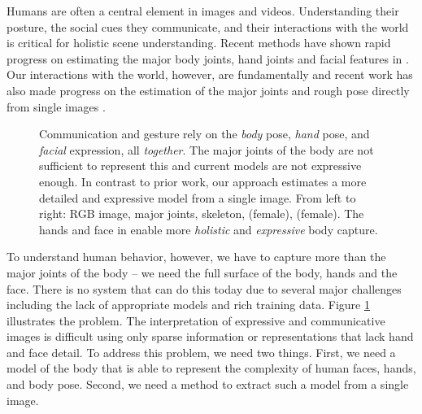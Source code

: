 Humans are often a central element in images and videos. 
Understanding their posture, the social cues they communicate, and their interactions with the world is critical for holistic scene understanding.
Recent methods have shown rapid progress on estimating the major body joints, hand joints and facial features in \twoD \cite{cao2017realtime,insafutdinov2016deepercut,simon2017hand}. 
Our interactions with the world, however, are fundamentally \threeD and recent work has also made progress on the \threeD estimation of the major joints and rough \threeD pose directly from single images \cite{bogo2016keep,kanazawa2018end,omran2018neural,pavlakos2018learning}. 

\newcommand{\ImgEmotionsHeightXX}{0.246}
\newcommand{\ImgEmotionsHeightYY}{0.31}
\newcommand{\ImgEmotionsHeightZZ}{0.160}
\newcommand{\ImgEmotionsHSpaceXX}{-3.0mm}
\newcommand{\ImgEmotionsVSpaceXX}{-4.0mm}
\begin{figure}
	\centering
	\vspace*{-01.00em}
	\vspace*{-00.50em}
	\caption{
				Communication and gesture rely on the \emph{body} pose, \emph{hand} pose, and \emph{facial} expression, all \emph{together}. 
				The major joints of the body are not sufficient to represent this and current \threeD models are not expressive enough. 
				In contrast to prior work, our approach estimates a more detailed and expressive \threeD model from a single image. 
				From left to right: RGB image, major joints, skeleton, \smpl (female), \smplHF (female). 
				The hands and face in \smplHF enable more \emph{holistic} and \emph{expressive} body capture. 
	}
	\label{fig:fromDotsToModels}
\vspace*{-3mm}
\end{figure}

 
To understand human behavior, however, we have to capture more than the major joints of the body -- we need the full \threeD surface of the body, hands and the face.
There is no system that can do this today due to several major challenges including the lack of appropriate \threeD models and rich \threeD training data.
Figure \ref{fig:fromDotsToModels} illustrates the problem. 
The interpretation of expressive and communicative images is difficult using only sparse \twoD information or \threeD representations that lack hand and face detail. 
To address this problem, we need two things. 
First, we need a \threeD model of the body that is able to represent the complexity of human faces, hands, and body pose.
Second, we need a method to extract such a model from a single image.

